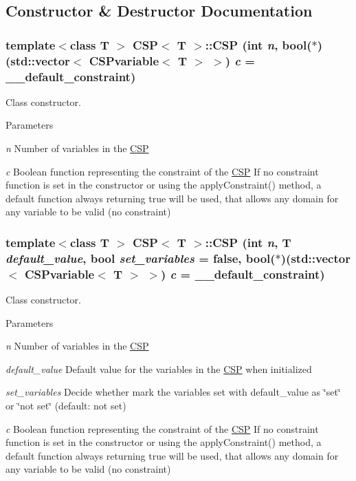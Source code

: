 \subsection{Constructor \& Destructor Documentation}
\hypertarget{classCSP_ad49548121582cc2d59e0d7f100092b75}{
\subsubsection[{CSP}]{\setlength{\rightskip}{0pt plus 5cm}template$<$class T $>$ {\bf CSP}$<$ T $>$::{\bf CSP} (int {\em n}, \/  bool($\ast$)(std::vector$<$ {\bf CSPvariable}$<$ T $>$ $>$) {\em c} = {\ttfamily \_\-\_\-default\_\-constraint})}}
\label{classCSP_ad49548121582cc2d59e0d7f100092b75}


Class constructor. 


\begin{DoxyParams}{Parameters}
\item[{\em n}]Number of variables in the \hyperlink{classCSP}{CSP} \item[{\em c}]Boolean function representing the constraint of the \hyperlink{classCSP}{CSP} If no constraint function is set in the constructor or using the applyConstraint() method, a default function always returning true will be used, that allows any domain for any variable to be valid (no constraint) \end{DoxyParams}
\hypertarget{classCSP_a734bb08d8f45394a2acfc8822981a6d0}{
\subsubsection[{CSP}]{\setlength{\rightskip}{0pt plus 5cm}template$<$class T $>$ {\bf CSP}$<$ T $>$::{\bf CSP} (int {\em n}, \/  T {\em default\_\-value}, \/  bool {\em set\_\-variables} = {\ttfamily false}, \/  bool($\ast$)(std::vector$<$ {\bf CSPvariable}$<$ T $>$ $>$) {\em c} = {\ttfamily \_\-\_\-default\_\-constraint})}}
\label{classCSP_a734bb08d8f45394a2acfc8822981a6d0}


Class constructor. 


\begin{DoxyParams}{Parameters}
\item[{\em n}]Number of variables in the \hyperlink{classCSP}{CSP} \item[{\em default\_\-value}]Default value for the variables in the \hyperlink{classCSP}{CSP} when initialized \item[{\em set\_\-variables}]Decide whether mark the variables set with default\_\-value as \char`\"{}set\char`\"{} or \char`\"{}not set\char`\"{} (default: not set) \item[{\em c}]Boolean function representing the constraint of the \hyperlink{classCSP}{CSP} If no constraint function is set in the constructor or using the applyConstraint() method, a default function always returning true will be used, that allows any domain for any variable to be valid (no constraint) \end{DoxyParams}


